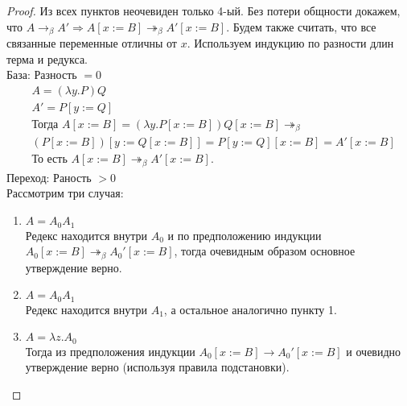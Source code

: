 \begin{proof}
Из всех пунктов неочевиден только 4-ый.
Без потери общности докажем, что $A \to_\beta A' \Rightarrow
A[x:=B] \twoheadrightarrow_\beta A'[x:=B]$.
Будем также считать, что все связанные переменные отличны от $x$.
Используем индукцию по разности длин терма и редукса. \\
База: Разность $= 0$
\begin{align}
& A = (\lambda y . P) Q \\
& A' = P[y:=Q] \\
& \text{Тогда } A[x:=B] = (\lambda y . P[x:=B]) Q[x:=B] \twoheadrightarrow_\beta \\
& (P[x:=B])[y:=Q[x:=B]] = P[y:=Q][x:=B] = A'[x:=B] \\
& \text{То есть } A[x:=B] \twoheadrightarrow_\beta A'[x:=B].
\end{align}
Переход: Раность $> 0$ \\
Рассмотрим три случая:
\begin{enumerate}
\item $A = A_0 A_1$ \\
Редекс находится внутри $A_0$ и по предположению индукции $A_0[x:=B]
\twoheadrightarrow_\beta A_0'[x:=B]$, тогда очевидным образом основное
утверждение верно.
\item $A = A_0 A_1$ \\
Редекс находится внутри $A_1$, а остальное аналогично пункту 1.
\item $A = \lambda z . A_0$ \\
Тогда из предположения индукции $A_0[x:=B] \to A_0'[x:=B]$ и
очевидно утверждение верно (используя правила подстановки).
\end{enumerate}
\end{proof}
